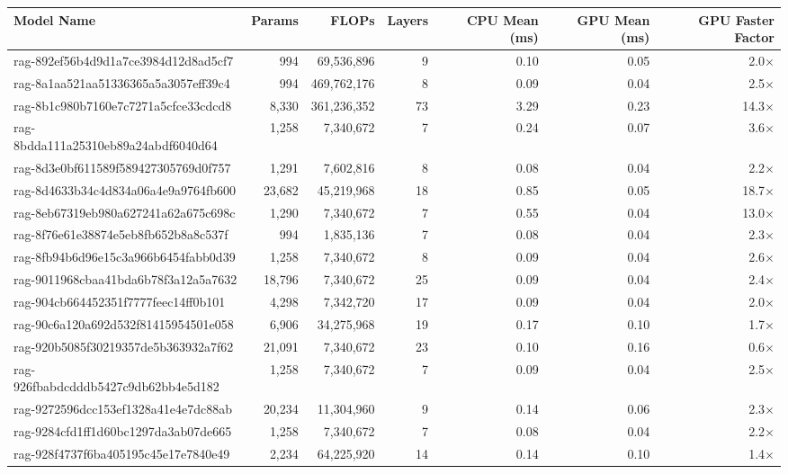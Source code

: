 \begin{table}[h!]
\centering
\fontsize{7}{9}\selectfont
\begin{tabular}{lrrrrrr}
\toprule
\textbf{Model Name} & \textbf{Params} & \textbf{FLOPs} & \textbf{Layers} & \textbf{CPU Mean (ms)} & \textbf{GPU Mean (ms)} & \textbf{GPU Faster Factor} \\
\midrule
rag-892ef56b4d9d1a7ce3984d12d8ad5cf7 & 994 & 69,536,896 & 9 & 0.10 & 0.05 & 2.0$\times$ \\
rag-8a1aa521aa51336365a5a3057eff39c4 & 994 & 469,762,176 & 8 & 0.09 & 0.04 & 2.5$\times$ \\
rag-8b1c980b7160e7c7271a5cfce33cdcd8 & 8,330 & 361,236,352 & 73 & 3.29 & 0.23 & 14.3$\times$ \\
rag-8bdda111a25310eb89a24abdf6040d64 & 1,258 & 7,340,672 & 7 & 0.24 & 0.07 & 3.6$\times$ \\
rag-8d3e0bf611589f589427305769d0f757 & 1,291 & 7,602,816 & 8 & 0.08 & 0.04 & 2.2$\times$ \\
rag-8d4633b34c4d834a06a4e9a9764fb600 & 23,682 & 45,219,968 & 18 & 0.85 & 0.05 & 18.7$\times$ \\
rag-8eb67319eb980a627241a62a675c698c & 1,290 & 7,340,672 & 7 & 0.55 & 0.04 & 13.0$\times$ \\
rag-8f76e61e38874e5eb8fb652b8a8c537f & 994 & 1,835,136 & 7 & 0.08 & 0.04 & 2.3$\times$ \\
rag-8fb94b6d96e15c3a966b6454fabb0d39 & 1,258 & 7,340,672 & 8 & 0.09 & 0.04 & 2.6$\times$ \\
rag-9011968cbaa41bda6b78f3a12a5a7632 & 18,796 & 7,340,672 & 25 & 0.09 & 0.04 & 2.4$\times$ \\
rag-904cb664452351f7777feec14ff0b101 & 4,298 & 7,342,720 & 17 & 0.09 & 0.04 & 2.0$\times$ \\
rag-90c6a120a692d532f81415954501e058 & 6,906 & 34,275,968 & 19 & 0.17 & 0.10 & 1.7$\times$ \\
rag-920b5085f30219357de5b363932a7f62 & 21,091 & 7,340,672 & 23 & 0.10 & 0.16 & 0.6$\times$ \\
rag-926fbabdcdddb5427c9db62bb4e5d182 & 1,258 & 7,340,672 & 7 & 0.09 & 0.04 & 2.5$\times$ \\
rag-9272596dcc153ef1328a41e4e7dc88ab & 20,234 & 11,304,960 & 9 & 0.14 & 0.06 & 2.3$\times$ \\
rag-9284cfd1ff1d60bc1297da3ab07de665 & 1,258 & 7,340,672 & 7 & 0.08 & 0.04 & 2.2$\times$ \\
rag-928f4737f6ba405195c45e17e7840e49 & 2,234 & 64,225,920 & 14 & 0.14 & 0.10 & 1.4$\times$ \\

\end{tabular}
\end{table}
